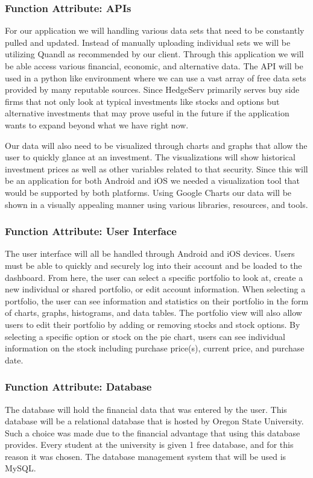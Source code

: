 \documentclass[onecolumn, draftclsnofoot,10pt, compsoc]{IEEEtran}
\begin{document}
\subsubsection{Function Attribute: APIs}
        For our application we will handling various data sets that need to be constantly pulled and updated. Instead of manually uploading individual sets we will be utilizing Quandl as recommended by our client. Through this application we will be able access various financial, economic, and alternative data. The API will be used in a python like environment where we can use a vast array of free data sets provided by many reputable sources. Since HedgeServ primarily serves buy side firms that not only look at typical investments like stocks and options but alternative investments that may prove useful in the future if the application wants to expand beyond what we have right now. 
        
        Our data will also need to be visualized through charts and graphs that allow the user to quickly glance at an investment. The visualizations will show historical investment prices as well as other variables related to that security. Since this will be an application for both Android and iOS we needed a visualization tool that would be supported by both platforms. Using Google Charts our data will be shown in a visually appealing manner using various libraries, resources, and tools. 
        
\subsubsection{Function Attribute: User Interface}
        The user interface will all be handled through Android and iOS devices. Users must be able to quickly and
        securely log into their account and be loaded to the dashboard. From here, the user can select a specific
        portfolio to look at, create a new individual or shared portfolio, or edit account information.
        When selecting a portfolio, the user can see information and statistics on their portfolio in the 
        form of charts, graphs, histograms, and data tables. The portfolio view will also allow users to edit their
        portfolio by adding or removing stocks and stock options. By selecting a specific option or stock on the
        pie chart, users can see individual information on the stock including purchase price(s), current price,
        and purchase date.
        
\subsubsection{Function Attribute: Database}
        The database will hold the financial data that was entered by the user. This database will be a relational database that is hosted by Oregon State University. Such a choice was
        made due to the financial advantage that using this database provides. Every student at the university is given 1 free database, and for this reason it was chosen. The database
        management system that will be used is MySQL.
\end{document}
